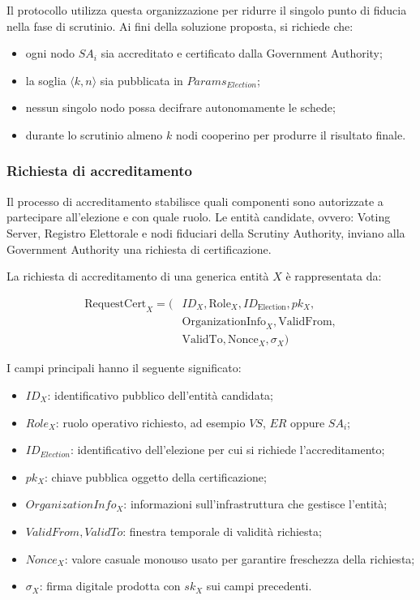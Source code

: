\documentclass[a4paper,12pt]{article}
\begin{document}
Il protocollo utilizza questa organizzazione per ridurre il singolo punto di fiducia nella fase di scrutinio. 
Ai fini della soluzione proposta, si richiede che:

\begin{itemize}
	\item ogni nodo \(SA_i\) sia accreditato e certificato dalla Government Authority;
	\item la soglia \(\langle k,n\rangle\) sia pubblicata in \(Params_{Election}\);
	\item nessun singolo nodo possa decifrare autonomamente le schede;
	\item durante lo scrutinio almeno \(k\) nodi cooperino per produrre il risultato finale.
\end{itemize}

\subsubsection{Richiesta di accreditamento}

Il processo di accreditamento stabilisce quali componenti sono autorizzate a partecipare all'elezione e con quale ruolo. 
Le entit\`a candidate, ovvero: Voting Server, Registro Elettorale e nodi fiduciari della Scrutiny Authority, inviano alla Government Authority una richiesta di certificazione.

La richiesta di accreditamento di una generica entit\`a \(X\) \`e rappresentata da:

\begin{equation}
\begin{split}
	\text{RequestCert}_X = \Big( & ID_X, \text{Role}_X, ID_{\text{Election}}, pk_X, \\
	& \text{OrganizationInfo}_X, \text{ValidFrom}, \\
	& \text{ValidTo}, \text{Nonce}_X, \sigma_X \Big)
\end{split}
\end{equation}

I campi principali hanno il seguente significato:

\begin{itemize}
	\item \(ID_X\): identificativo pubblico dell'entit\`a candidata;
	\item \(Role_X\): ruolo operativo richiesto, ad esempio \(VS\), \(ER\) oppure \(SA_i\);
	\item \(ID_{Election}\): identificativo dell'elezione per cui si richiede l'accreditamento;
	\item \(pk_X\): chiave pubblica oggetto della certificazione;
	\item \(OrganizationInfo_X\): informazioni sull'infrastruttura che gestisce l'entit\`a;
	\item \(ValidFrom, ValidTo\): finestra temporale di validit\`a richiesta;
	\item \(Nonce_X\): valore casuale monouso usato per garantire freschezza della richiesta;
	\item \(\sigma_X\): firma digitale prodotta con \(sk_X\) sui campi precedenti.
\end{itemize}
\end{document}
